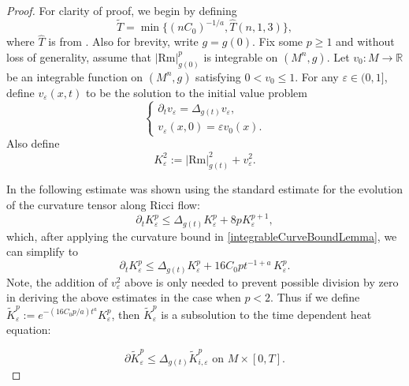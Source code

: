 \documentclass{amsart}
\theoremstyle{definition}
\newcommand{\Rm}{\mathrm{Rm}}
\let\epsilon\varepsilon
\begin{document}
\begin{proof}
For clarity of proof, we begin by defining 
\[
\widetilde T=\min\{(nC_0)^{-1/a},\widehat T(n,1,3)\},
\]
where $\widehat T$ is from {\cite[Theorem 1.1]{LeeTam}}. Also for brevity, write $g=g(0)$. Fix some $p\geq 1$ and without loss of generality, assume that $|\Rm|_{g(0)}^p$ is integrable on $(M^n, g)$. Let $v_0 : M \to \mathbb{R}$ be an integrable function on $(M^n, g)$ satisfying $0 < v_0 \le 1$. For any $\varepsilon \in (0,1]$, define $v_{\varepsilon}(x, t)$ to be the solution to the initial value problem
\[
\begin{cases}
\partial_t v_{\varepsilon} = \Delta_{g(t)} v_{\varepsilon},\\
v_{\varepsilon}(x, 0) = \varepsilon v_0(x).
\end{cases}
\]
Also define
\[
K_{\varepsilon}^2 := | \mathrm{Rm} |_{g(t)}^2 + v_{\varepsilon}^2.
\]


In {\cite[Lemma 2.1]{ChauMartens}} the following estimate was shown using the standard estimate for the evolution of the curvature tensor along Ricci flow:
\[
\partial_t K_{\varepsilon}^p \le \Delta_{g(t)} K_{\varepsilon}^p + 8 p K_{\varepsilon}^{p+1},
\]
which, after applying the curvature bound in \eqref{integrableCurveBoundLemma}, we can simplify to
\begin{equation}\label{evolOfKp}
\partial_t K_{\varepsilon}^p \le \Delta_{g(t)} K_{\varepsilon}^p + 16C_0p t^{-1+a}\, K_{\varepsilon}^{p}.
\end{equation}
Note, the addition of $v_{\varepsilon}^2$ above is only needed to prevent possible division by zero in deriving the above estimates in the case when $p<2$.  Thus if we define $\widetilde K_{\varepsilon}^p:=e^{-(16C_0p/a)t^{a}}K_{\varepsilon}^p$, then $\widetilde K_\epsilon^p$ is a subsolution to the time dependent heat equation:  

\begin{equation}\label{upperlowerK}
\partial \widetilde K_{\varepsilon}^p  \le  \Delta_{g(t)} \widetilde K_{i,\varepsilon}^p \text{   on } M\times[0, T].
\end{equation}

    


\end{proof}
\end{document}
